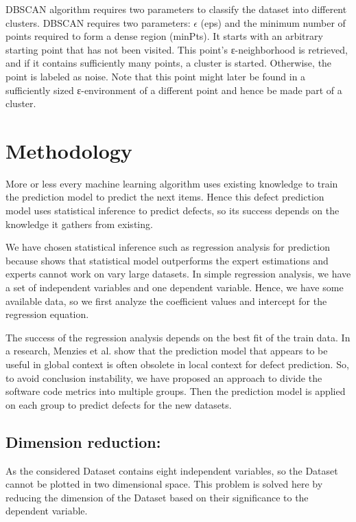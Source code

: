 \documentclass[12pt]{report}
\begin{document}
DBSCAN algorithm requires two parameters to classify the dataset into different clusters. DBSCAN requires two parameters: $\epsilon$ (eps) and the minimum number of points required to form a dense region (minPts). It starts with an arbitrary starting point that has not been visited. This point's ε-neighborhood is retrieved, and if it contains sufficiently many points, a cluster is started. Otherwise, the point is labeled as noise. Note that this point might later be found in a sufficiently sized ε-environment of a different point and hence be made part of a cluster.

\section{Methodology}
More or less every machine learning algorithm uses existing knowledge to train the prediction model to predict the next items. Hence this defect prediction model uses statistical inference to predict defects, so its success depends on the knowledge it gathers from existing. 

We have chosen statistical inference such as regression analysis for prediction because \cite{catal2009systematic}shows that statistical model outperforms the expert estimations and experts cannot work on vary large datasets. In simple regression analysis, we have a set of independent variables and one dependent variable. Hence, we have some available data, so we first analyze the coefficient values and intercept for the regression equation.

The success of the regression analysis depends on the best fit of the train data. In a research, Menzies et al. show that the prediction model that appears to be useful in global context is often obsolete in local context for defect prediction. So, to avoid conclusion instability, we have proposed an approach to divide the software code metrics into multiple groups. Then the prediction model is applied on each group to predict defects for the new datasets.  

\subsection{Dimension reduction:} 
As the considered Dataset contains eight independent variables, so the Dataset cannot be plotted in two dimensional space. This problem is solved here by reducing the dimension of the Dataset based on their significance to the dependent variable.  
\end{document}
